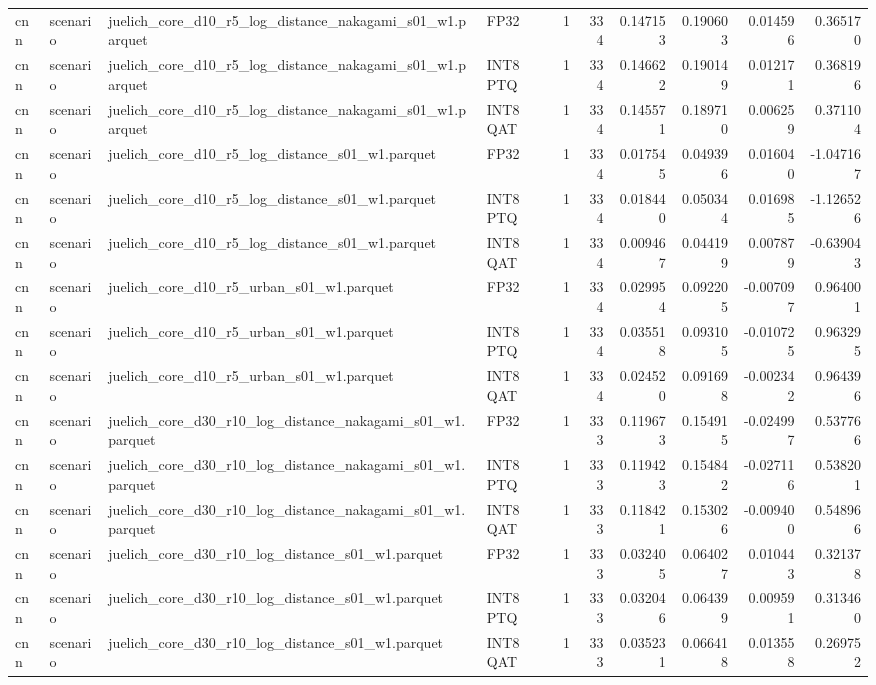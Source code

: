 \begin{tabular}{llllrrrrrr}
cnn & scenario & juelich\_core\_d10\_r5\_log\_distance\_nakagami\_s01\_w1.parquet & FP32 & 1 & 334 & 0.147153 & 0.190603 & 0.014596 & 0.365170 \\
cnn & scenario & juelich\_core\_d10\_r5\_log\_distance\_nakagami\_s01\_w1.parquet & INT8 PTQ & 1 & 334 & 0.146622 & 0.190149 & 0.012171 & 0.368196 \\
cnn & scenario & juelich\_core\_d10\_r5\_log\_distance\_nakagami\_s01\_w1.parquet & INT8 QAT & 1 & 334 & 0.145571 & 0.189710 & 0.006259 & 0.371104 \\
cnn & scenario & juelich\_core\_d10\_r5\_log\_distance\_s01\_w1.parquet & FP32 & 1 & 334 & 0.017545 & 0.049396 & 0.016040 & -1.047167 \\
cnn & scenario & juelich\_core\_d10\_r5\_log\_distance\_s01\_w1.parquet & INT8 PTQ & 1 & 334 & 0.018440 & 0.050344 & 0.016985 & -1.126526 \\
cnn & scenario & juelich\_core\_d10\_r5\_log\_distance\_s01\_w1.parquet & INT8 QAT & 1 & 334 & 0.009467 & 0.044199 & 0.007879 & -0.639043 \\
cnn & scenario & juelich\_core\_d10\_r5\_urban\_s01\_w1.parquet & FP32 & 1 & 334 & 0.029954 & 0.092205 & -0.007097 & 0.964001 \\
cnn & scenario & juelich\_core\_d10\_r5\_urban\_s01\_w1.parquet & INT8 PTQ & 1 & 334 & 0.035518 & 0.093105 & -0.010725 & 0.963295 \\
cnn & scenario & juelich\_core\_d10\_r5\_urban\_s01\_w1.parquet & INT8 QAT & 1 & 334 & 0.024520 & 0.091698 & -0.002342 & 0.964396 \\
cnn & scenario & juelich\_core\_d30\_r10\_log\_distance\_nakagami\_s01\_w1.parquet & FP32 & 1 & 333 & 0.119673 & 0.154915 & -0.024997 & 0.537766 \\
cnn & scenario & juelich\_core\_d30\_r10\_log\_distance\_nakagami\_s01\_w1.parquet & INT8 PTQ & 1 & 333 & 0.119423 & 0.154842 & -0.027116 & 0.538201 \\
cnn & scenario & juelich\_core\_d30\_r10\_log\_distance\_nakagami\_s01\_w1.parquet & INT8 QAT & 1 & 333 & 0.118421 & 0.153026 & -0.009400 & 0.548966 \\
cnn & scenario & juelich\_core\_d30\_r10\_log\_distance\_s01\_w1.parquet & FP32 & 1 & 333 & 0.032405 & 0.064027 & 0.010443 & 0.321378 \\
cnn & scenario & juelich\_core\_d30\_r10\_log\_distance\_s01\_w1.parquet & INT8 PTQ & 1 & 333 & 0.032046 & 0.064399 & 0.009591 & 0.313460 \\
cnn & scenario & juelich\_core\_d30\_r10\_log\_distance\_s01\_w1.parquet & INT8 QAT & 1 & 333 & 0.035231 & 0.066418 & 0.013558 & 0.269752 \\

\end{tabular}
